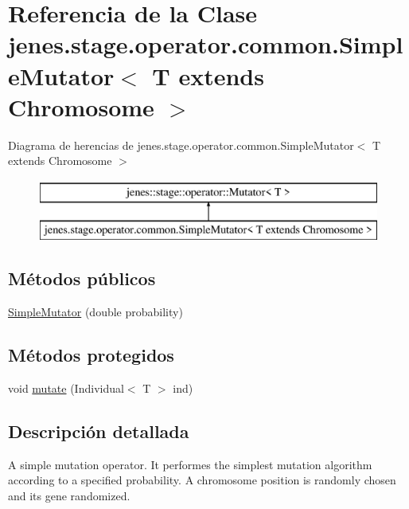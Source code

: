 \hypertarget{classjenes_1_1stage_1_1operator_1_1common_1_1_simple_mutator_3_01_t_01extends_01_chromosome_01_4}{\section{Referencia de la Clase jenes.\-stage.\-operator.\-common.\-Simple\-Mutator$<$ T extends Chromosome $>$}
\label{classjenes_1_1stage_1_1operator_1_1common_1_1_simple_mutator_3_01_t_01extends_01_chromosome_01_4}
}
Diagrama de herencias de jenes.\-stage.\-operator.\-common.\-Simple\-Mutator$<$ T extends Chromosome $>$\begin{figure}[H]
\begin{center}
\leavevmode
\includegraphics[height=2.000000cm]{classjenes_1_1stage_1_1operator_1_1common_1_1_simple_mutator_3_01_t_01extends_01_chromosome_01_4}
\end{center}
\end{figure}
\subsection*{Métodos públicos}
\begin{DoxyCompactItemize}
\item 
\hyperlink{classjenes_1_1stage_1_1operator_1_1common_1_1_simple_mutator_3_01_t_01extends_01_chromosome_01_4_a5872d2360575c78f7b010aaee5ba5b30}{Simple\-Mutator} (double probability)
\end{DoxyCompactItemize}
\subsection*{Métodos protegidos}
\begin{DoxyCompactItemize}
\item 
void \hyperlink{classjenes_1_1stage_1_1operator_1_1common_1_1_simple_mutator_3_01_t_01extends_01_chromosome_01_4_af54219113222ec25ff39116d3925cc4d}{mutate} (Individual$<$ T $>$ ind)
\end{DoxyCompactItemize}


\subsection{Descripción detallada}
A simple mutation operator. It performes the simplest mutation algorithm according to a specified probability. A chromosome position is randomly chosen and its gene randomized. 


